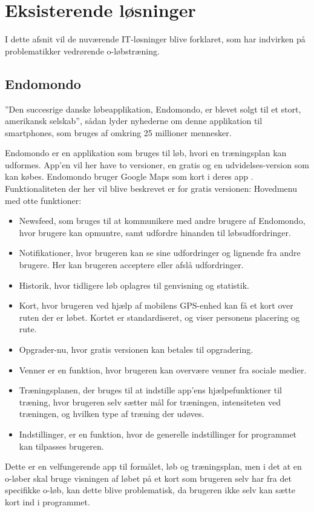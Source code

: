 \newpage
\section{Eksisterende løsninger}
I dette afsnit vil de nuværende IT-løsninger blive forklaret, som har indvirken på problematikker vedrørende o-løbstræning. 

\subsection{Endomondo}
”Den succesrige danske løbeapplikation, Endomondo, er blevet solgt til et stort, amerikansk selskab”, sådan lyder nyhederne om denne applikation til smartphones, som bruges af omkring 25 millioner mennesker. \citep{ENDO}

Endomondo er en applikation som bruges til løb, hvori en træningsplan kan udformes. App’en vil her have to versioner, en gratis og en udvidelses-version som kan købes. Endomondo bruger Google Maps som kort i deres app \citep{ENDOMAPS}. Funktionaliteten der her vil blive beskrevet er for gratis versionen: Hovedmenu med otte funktioner:
\begin{itemize}
	\item Newsfeed, som bruges til at kommunikere med andre brugere af Endomondo, hvor brugere kan opmuntre, samt udfordre hinanden til løbsudfordringer.
	\item Notifikationer, hvor brugeren kan se sine udfordringer og lignende fra andre brugere. Her kan brugeren acceptere eller afslå udfordringer.
	\item Historik, hvor tidligere løb oplagres til genvisning og statistik.
	\item Kort, hvor brugeren ved hjælp af mobilens GPS-enhed kan få et kort over ruten der er løbet. Kortet er standardiseret, og viser personens placering og rute.
	\item Opgrader-nu, hvor gratis versionen kan betales til opgradering.
	\item Venner er en funktion, hvor brugeren kan overvære venner fra sociale medier.
	\item Træningsplanen, der bruges til at indstille app’ens hjælpefunktioner til træning, hvor brugeren selv sætter mål for træningen, intensiteten ved træningen, og hvilken type af træning der udøves.
	\item Indstillinger, er en funktion, hvor de generelle indstillinger for programmet kan tilpasses brugeren.
\end{itemize}
Dette er en velfungerende app til formålet, løb og træningsplan, men i det at en o-løber skal bruge visningen af løbet på et kort som brugeren selv har fra det specifikke o-løb, kan dette blive problematisk, da brugeren ikke selv kan sætte kort ind i programmet. 


